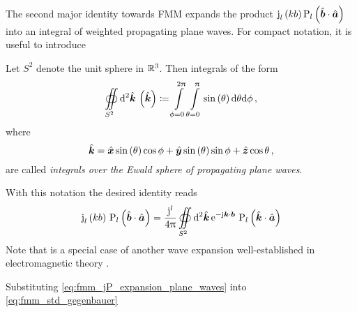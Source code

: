 The second major identity towards \ac{FMM} expands the product 
$\sphbesselj{l} \left( k b \right) \legendrepl{l} \left( \uv{b} \cdot \uv{a} \right)$
into an integral of weighted propagating plane waves. For compact notation, it
is useful to introduce
\begin{definition}\label{def:ewald_sphere}
	Let $S^2$ denote the unit sphere in $\mathbb{R}^3$. Then
	integrals of the form
	\begin{equation}\label{eq:ewald_sphere_integral}
		\ewaldintegral \left(\uv{k}\right) 
		\coloneqq
		\int\limits_{\phi = 0}^{2\pi} \int\limits_{\theta = 0}^{\pi}
		\sin\left(\theta \right) \dd \theta \dd \phi \, ,
	\end{equation}
	where
	\begin{equation}
		\uv{k} =
		\uv{x} \sin \left(\theta\right) \cos \phi +
		\uv{y} \sin \left(\theta\right) \sin \phi +
		\uv{z} \cos \theta \, ,
	\end{equation}
	are called \emph{integrals over the Ewald sphere of propagating plane waves}.
\end{definition}
With this notation the desired identity reads
\begin{equation}\label{eq:fmm_jP_expansion_plane_waves}
		\sphbesselj{l} \left( k b    \right) \,
		\legendrepl{l} \left( \uv{b} \cdot \uv{a} \right) = 
		\frac{\im^l}{4\pi}	
		\ewaldintegral
		\exp{-\im \pvec{k} \cdot \pvec{b}}
		\legendrepl{l} \left( \uv{k} \cdot \uv{a} \right)
\end{equation}
Note that is a special case of another wave expansion well-established in
electromagnetic theory \cite[p.~410]{Stratton2007}.

Substituting \eqref{eq:fmm_jP_expansion_plane_waves} into
\eqref{eq:fmm_std_gegenbauer}











